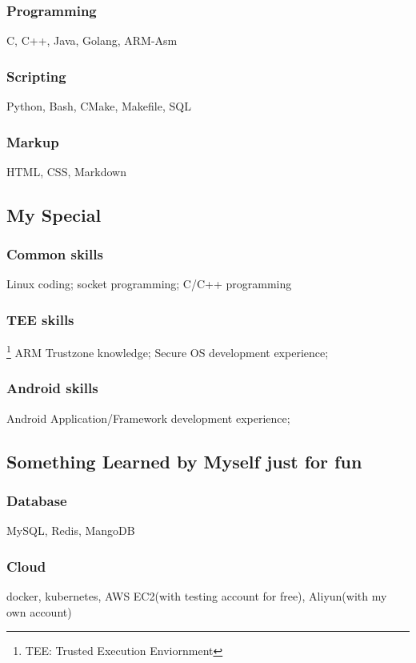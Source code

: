 \documentclass{article}
\begin{document}
\subsubsection{Programming}
C, C++, Java, Golang, ARM-Asm

\subsubsection{Scripting}
Python, Bash, CMake, Makefile, SQL

\subsubsection{Markup}
HTML, CSS, Markdown

\subsection{My Special}

\subsubsection {Common skills}
Linux coding; socket programming; C/C++ programming

\subsubsection {TEE skills}\footnote {TEE: Trusted Execution Enviornment}
ARM Trustzone knowledge; Secure OS development experience;

\subsubsection {Android skills}
Android Application/Framework development experience;

\subsection {Something Learned by Myself just for fun}
\subsubsection {Database}
MySQL, Redis, MangoDB

\subsubsection {Cloud}
docker, kubernetes, AWS EC2(with testing account for free), Aliyun(with my own account)
\end{document}
